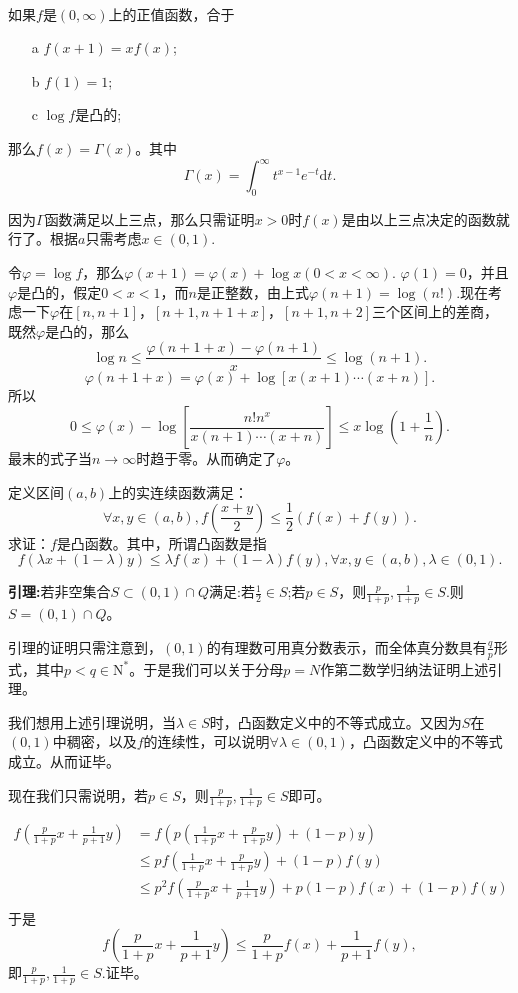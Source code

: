   \begin{example}
  \hfill\\
  如果$f$是$(0,\infty)$上的正值函数，合于
  \begin{enumerate}
  \item[a] $f(x+1)=xf(x)$;
  \item[b] $f(1)=1$;
  \item[c] $\log f$是凸的;
  \end{enumerate}
  那么$f(x)=\Gamma(x)$。其中$$\Gamma(x)=\int_0^{\infty}t^{x-1}e^{-t}\mathrm{d}t.$$
  
  因为$\Gamma$函数满足以上三点，那么只需证明$x>0$时$f(x)$是由以上三点决定的函数就行了。根据$a$只需考虑$x\in(0,1).$
  
  令$\varphi =\log f$，那么$\varphi(x+1)=\varphi(x)+\log x(0<x<\infty).$ $\varphi(1)=0$，并且$\varphi$是凸的，假定$0<x<1$，而$n$是正整数，由上式$\varphi(n+1)=\log (n!).$现在考虑一下$\varphi$在$[n,n+1]$，$[n+1,n+1+x]$，$[n+1,n+2]$三个区间上的差商，既然$\varphi$是凸的，那么$$\log n\leq\frac{\varphi(n+1+x)-\varphi(n+1)}{x}\leq\log(n+1).$$
  $$\varphi(n+1+x)=\varphi(x)+\log[x(x+1)\cdots(x+n)].$$
  所以$$0\leq\varphi(x)-\log[\frac{n!n^x}{x(n+1)\cdots(x+n)}]\leq x\log(1+\frac{1}{n}).$$
  最末的式子当$n\to\infty$时趋于零。从而确定了$\varphi$。
  \end{example}
 
\begin{example}
定义区间$(a,b)$上的实连续函数满足：
$$\forall x,y \in(a,b),f(\frac{x+y}{2})\leq\frac{1}{2}(f(x)+f(y)).$$
求证：$f$是凸函数。其中，所谓凸函数是指
$$f(\lambda x+(1-\lambda)y)\leq\lambda f(x)+(1-\lambda)f(y),\forall x,y\in(a,b),\lambda\in(0,1).$$

\textbf{引理:}若非空集合$S\subset(0,1)\cap\mathit{Q}$满足:若$\frac{1}{2}\in S$;若$p\in S$，则$\frac{p}{1+p},\frac{1}{1+p}\in S.$则$S=(0,1)\cap\mathit{Q}$。

引理的证明只需注意到，$(0,1)$的有理数可用真分数表示，而全体真分数具有$\frac{q}{p}$形式，其中$p<q\in\mathrm{N}^*$。于是我们可以关于分母$p=N$作第二数学归纳法证明上述引理。

我们想用上述引理说明，当$\lambda\in S$时，凸函数定义中的不等式成立。又因为$S$在$(0,1)$中稠密，以及$f$的连续性，可以说明$\forall\lambda\in(0,1)$，凸函数定义中的不等式成立。从而证毕。

现在我们只需说明，若$p\in S$，则$\frac{p}{1+p},\frac{1}{1+p}\in S$即可。

\begin{align*}
f(\frac{p}{1+p}x+\frac{1}{p+1}y)&=f(p(\frac{1}{1+p}x+\frac{p}{1+p}y)+(1-p)y)\\
&\leq pf(\frac{1}{1+p}x+\frac{p}{1+p}y)+(1-p)f(y)\\
&\leq p^2f(\frac{p}{1+p}x+\frac{1}{p+1}y)+p(1-p)f(x)+(1-p)f(y)\\
\end{align*}
于是
$$f(\frac{p}{1+p}x+\frac{1}{p+1}y)\leq \frac{p}{1+p}f(x)+\frac{1}{p+1}f(y),$$
即$\frac{p}{1+p},\frac{1}{1+p}\in S.$证毕。
\end{example} 
 
